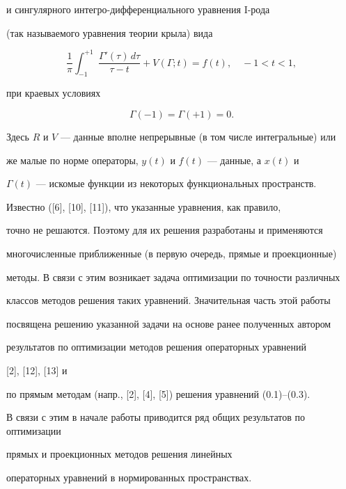 и сингулярного интегро-дифференциального уравнения I-рода


(так называемого уравнения теории крыла) вида


\begin{equation}


\frac{1}{\pi}\int_{-1}^{+1}\;\frac{\Gamma '(\tau)\, d\tau}{\tau -t}


+V(\Gamma;t)=f(t),\quad -1<t<1,


\tag{0.3}


\end{equation}


при краевых условиях


\begin{equation}


\Gamma(-1)=\Gamma(+1)=0.


\tag{0.3$'$}


\end{equation}


Здесь $R$ и $V$ --- данные вполне непрерывные (в том числе интегральные) или


же малые по норме операторы, $y(t)$ и $f(t)$ --- данные, а $x(t)$ и


$\Gamma(t)$ --- искомые функции из некоторых функциональных пространств.





Известно ([6], [10], [11]), что указанные уравнения, как правило,


точно не решаются. Поэтому для их решения разработаны и применяются


многочисленные приближенные (в первую очередь, прямые и проекционные)


методы. В связи с этим возникает задача оптимизации по точности различных


классов методов решения таких уравнений. Значительная часть этой работы


посвящена решению указанной задачи на основе ранее полученных автором


результатов по оптимизации методов решения операторных уравнений


[2], [12], [13] и


по прямым методам (напр., [2], [4], [5]) решения уравнений (0.1)--(0.3).


В связи с этим в начале работы приводится ряд общих результатов по оптимизации


прямых и проекционных методов решения линейных


операторных уравнений в нормированных пространствах.





